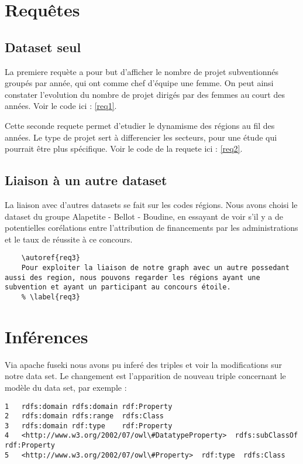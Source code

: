 \chapter{Requêtes}
\section{Dataset seul}

La premiere requète a pour but d'afficher le nombre de projet subventionnés groupés par année, qui ont comme chef d'équipe une femme. On peut ainsi constater l'evolution du nombre de projet dirigés par des femmes au court des années. Voir le code ici : \autoref{req1}.


Cette seconde requete permet d'etudier le dynamisme des régions au fil des années. Le type de projet sert à differencier les secteurs, pour une étude qui pourrait être plus spécifique. Voir le code de la requete ici : \autoref{req2}.

\section{Liaison à un autre dataset}

La liaison avec d'autres datasets se fait sur les codes régions. Nous avons choisi le dataset du groupe Alapetite - Bellot - Boudine, en essayant de voir s'il y a de potentielles corélations entre l'attribution de financements par les administrations et le taux de réussite à ce concours.

\begin{verbatim}
    \autoref{req3}
    Pour exploiter la liaison de notre graph avec un autre possedant aussi des region, nous pouvons regarder les régions ayant une subvention et ayant un participant au concours étoile.
    % \label{req3}
\end{verbatim}


\chapter{Inférences}

Via apache fuseki nous avons pu inferé des triples et voir la modifications sur notre data set. Le changement est l'apparition de nouveau triple concernant le modèle du data set, par exemple :

\begin{lstlisting}
1	rdfs:domain rdfs:domain rdf:Property
2	rdfs:domain rdfs:range  rdfs:Class
3	rdfs:domain rdf:type    rdf:Property
4	<http://www.w3.org/2002/07/owl\#DatatypeProperty>  rdfs:subClassOf rdf:Property
5	<http://www.w3.org/2002/07/owl\#Property>  rdf:type  rdfs:Class
\end{lstlisting}

